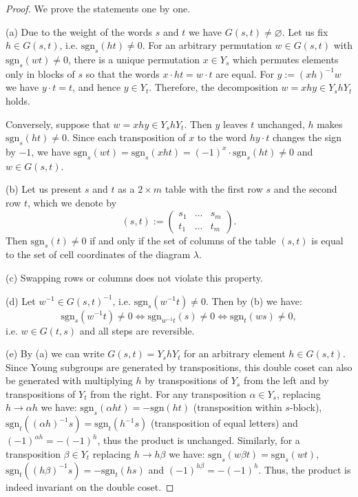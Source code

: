 \documentclass[10pt,a4paper]{amsart}
\newcommand{\sgn}{\mathrm{sgn}}
\begin{document}
\begin{proof}
    We prove the statements one by one.
    
    (a) Due to the weight of the words $s$ and $t$ we have $G(s,t) \neq \varnothing$. Let us fix $h \in G(s,t)$, i.e. $\sgn_s(ht) \neq 0$.
	For an arbitrary permutation $w \in G(s,t)$ with $\sgn_{s}(w t) \neq 0$, there is a unique permutation $x \in Y_{s}$ which permutes elements only in blocks of $s$ so that the words $x\cdot h t = w \cdot t$ are equal. For $y := (xh)^{-1} w$ we have $y \cdot t = t$, and hence $y \in Y_t$. Therefore, the decomposition $w = xhy \in Y_s h Y_t$ holds. 
	
	Conversely, suppose that $w = xhy \in Y_s h Y_t$. Then $y$ leaves $t$ unchanged, $h$ makes $\sgn_s(ht) \neq 0$. Since each transposition of $x$ to the word $hy \cdot t$ changes the sign by $-1$, we have $\sgn_s(wt) = \sgn_s(xht) = (-1)^{x} \cdot \sgn_s(ht) \neq 0$ and $w \in G(s,t)$.
	
	\vspace{0.5em}

    (b) Let us present $s$ and $t$ as a $2 \times m$ table with the first row $s$ and the second row $t$, which we denote by 
    $$(s,t) := \begin{pmatrix}
        s_1 & \ldots & s_m\\
        t_1 & \ldots & t_m
    \end{pmatrix}.
    $$ 
    Then $\sgn_s(t) \neq 0$ if and only if the set of columns of the table $(s,t)$ is equal to the set of cell coordinates of the diagram $\lambda$. 
    
    \vspace{0.5em}

    (c) Swapping rows or columns does not violate this property. 
    
    \vspace{0.5em}

    (d) Let $w^{-1} \in G(s,t)^{-1}$, i.e. $\sgn_s(w^{-1} t) \neq 0$. Then by (b) we have:
    $$
        \sgn_s(w^{-1}t) \neq 0 \iff \sgn_{w^{-1}t}(s) \neq 0 \iff \sgn_{t}(ws) \neq 0,
    $$
    i.e. $w \in G(t,s)$ and all steps are reversible.
    
    \vspace{0.5em}

    (e) By (a) we can write $G(s,t) = Y_s h Y_t$ for an arbitrary element $h \in G(s,t)$. Since Young subgroups are generated by transpositions, this double coset can also be generated with multiplying $h$ by transpositions of $Y_s$ from the left and by transpositions of $Y_t$ from the right. 
    For any transposition $\alpha \in Y_s$, replacing $h \to \alpha h$ we have: $\sgn_s(\alpha h t) = -\sgn(h t)$ (transposition within $s$-block), $\sgn_t((\alpha h)^{-1}s) = \sgn_t(h^{-1} s)$ (transposition of equal letters) and $(-1)^{\alpha h} = -(-1)^{h}$, thus the product is unchanged. 
    Similarly, for a transposition $\beta \in Y_t$ replacing $h \to h \beta$ we have: $\sgn_s(w\beta t) = \sgn_s(wt)$, $\sgn_t((h\beta)^{-1} s) = -\sgn_t(hs)$ and $(-1)^{h\beta} = -(-1)^{h}$. Thus, the product is indeed invariant on the double coset.
    

\end{proof}
\end{document}
